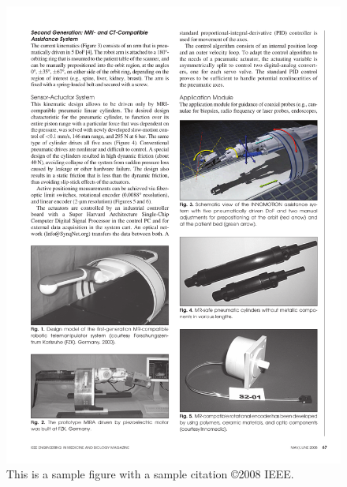 \begin{figure}[h]
  \begin{center}
    \includegraphics[width=120mm]{fig/chap1/innomotion.pdf}
  \end{center}
  \vspace{-4mm}
\caption[CAD model of the Innomotion robotic system.]
{This is a sample figure with a sample citation \cite{Fischer2008_TMECH} \copyright 2008 IEEE.}
 \label{fig:exampleFigure}
\vspace{-2mm}
\end{figure}


